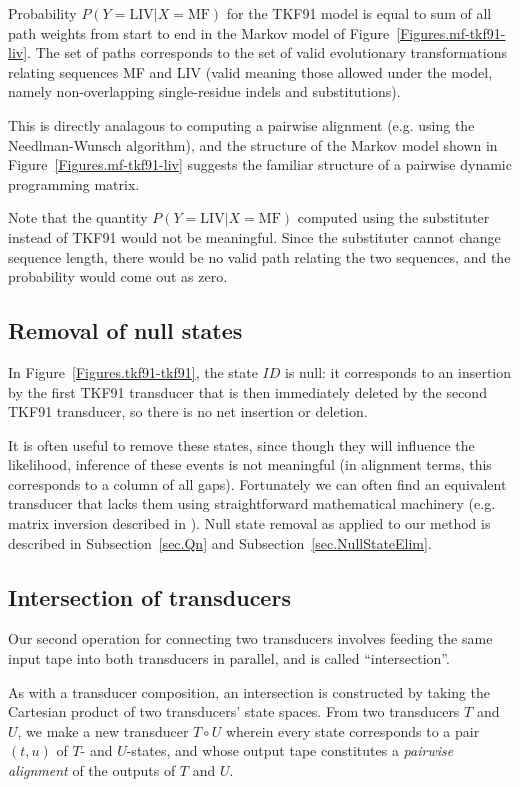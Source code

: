 \documentclass{article}
\newcommand{\secref}[1]{Subsection~\ref{sec.#1}}
\newcommand{\seclabel}[1]{\label{sec.#1}}
\newcommand{\figref}[1]{Figure~\ref{Figures.#1}}
\newcommand\fork{\circ}
\begin{document}
Probability $P(Y=\mbox{LIV}|X=\mbox{MF})$ for the TKF91 model
is equal to sum of all path weights from start to end in the Markov model of \figref{mf-tkf91-liv}. 
The set of paths corresponds to the set of valid evolutionary transformations relating
sequences MF and LIV (valid meaning those allowed under the model, namely non-overlapping single-residue indels and substitutions).  

This is directly analagous to computing a pairwise alignment (e.g. using the Needlman-Wunsch algorithm), and the structure of the Markov model shown in \figref{mf-tkf91-liv} suggests the familiar structure of a pairwise dynamic programming matrix.  

Note that the quantity  $P(Y=\mbox{LIV}|X=\mbox{MF})$ computed 
using the  substituter instead of TKF91 would not be meaningful.  
Since the substituter cannot change sequence length, there would be no
valid path relating the two sequences, and the probability would come out as zero.  

\subsection{Removal of null states}

In \figref{tkf91-tkf91}, the state $ID$ is null:
it corresponds to an insertion by the first TKF91 transducer
that is then immediately deleted by the second TKF91 transducer,
so there is no net insertion or deletion.

It is often useful to remove these states, since though they will influence
the likelihood, inference of these events is not meaningful (in alignment terms,
this corresponds to a column of all gaps).  
Fortunately we can often find an equivalent transducer that lacks them
using straightforward mathematical machinery (e.g. matrix inversion described in \cite{BradleyHolmes2009}).  
Null state removal as applied to our method is described in
 \secref{Qn} and \secref{NullStateElim}.  


\subsection{Intersection of transducers}
\seclabel{Tutorial.Intersection}

Our second operation for connecting two transducers
involves feeding the same input tape into both transducers in parallel,
and is called ``intersection''.

As with a transducer composition,
an intersection is constructed by taking the Cartesian product of two transducers' state spaces.
From two transducers $T$ and $U$,
we make a new transducer $T \fork U$
wherein every state corresponds to a pair $(t,u)$ of $T$- and $U$-states,
and whose output tape constitutes a {\em pairwise alignment} of the outputs of $T$ and $U$.
\end{document}
